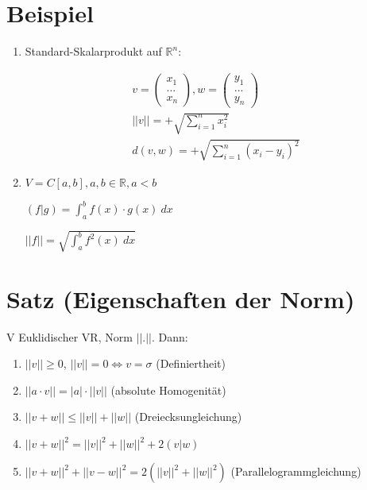 \documentclass[a4paper, openany]{book}
\begin{document}
        \section{Beispiel}

        \begin{enumerate}[label=(\alph*)]
          \item Standard-Skalarprodukt auf $\mathbb{R}^n$:

          \begin{align*}
            v = \begin{pmatrix} x_1 \\ ... \\ x_n \end{pmatrix}, w = \begin{pmatrix}y_1 \\ ... \\ y_n \end{pmatrix} \\
            ||v|| = + \sqrt{\sum_{i=1}^n x_i^2} \\
            d(v,w) = + \sqrt{\sum_{i=1}^n (x_i - y_i)^2}
          \end{align*}

          \item $V = C[a,b], a,b \in \mathbb{R}, a < b$

          $(f|g) = \int_a^b f(x) \cdot g(x) \ dx$

          $||f|| = \sqrt{\int_a^b f^2(x) \ dx}$
        \end{enumerate}

        \section{Satz (Eigenschaften der Norm)}

        V Euklidischer VR, Norm $||.||$. Dann:

        \begin{enumerate}[label=(\alph*)]
          \item $||v|| \ge 0$, $||v|| = 0 \Leftrightarrow v = \sigma$ (Definiertheit)

          \item $||a \cdot v|| = |a| \cdot ||v||$ (absolute Homogenität)

          \item $||v + w|| \le ||v|| + ||w||$ (Dreiecksungleichung)

          \item $||v+w||^2 = ||v||^2 + ||w||^2 + 2 (v|w)$

          \item $||v+w||^2 + ||v-w||^2 = 2 (||v||^2 + ||w||^2)$ (Parallelogrammgleichung)
        \end{enumerate}
\end{document}
